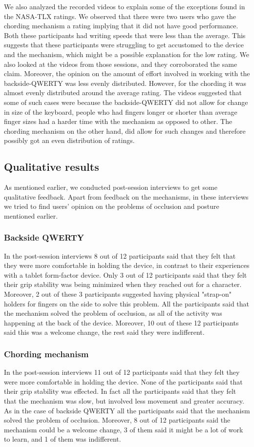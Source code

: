 We also analyzed the recorded videos to explain some of the exceptions found in the NASA-TLX ratings. We observed that there were two users who gave the chording mechanism a rating implying that it did not have good performance. Both these participants had writing speeds that were less than the average. This suggests that these participants were struggling to get accustomed to the device and the mechanism, which might be a possible explanation for the low rating. We also looked at the videos from those sessions, and they corroborated the same claim. Moreover, the opinion on the amount of effort involved in working with the backside-QWERTY was less evenly distributed. However, for the chording it was almost evenly distributed around the average rating. The videos suggested that some of such cases were because the backside-QWERTY did not allow for change in size of the keyboard, people who had fingers longer or shorter than average finger sizes had a harder time with the mechanism as opposed to other. The chording mechanism on the other hand, did allow for such changes and therefore possibly got an even distribution of ratings.

\subsection{Qualitative results}
As mentioned earlier, we conducted post-session interviews to get some qualitative feedback. Apart from feedback on the mechanisms, in these interviews we tried to find users' opinion on the problems of occlusion and posture mentioned earlier.
\subsubsection{Backside QWERTY}
In the post-session interviews 8 out of 12 participants said that they felt that they were more comfortable in holding the device, in contrast to their experiences with a tablet form-factor device.
Only 3 out of 12 participants said that they felt their grip stability was being minimized when they reached out for a character. Moreover, 2 out of these 3 participants suggested having physical "strap-on" holders for fingers on the side to solve this problem. All the participants said that the mechanism solved the problem of occlusion, as all of the activity was happening at the back of the device. Moreover, 10 out of these 12 participants said this was a welcome change, the rest said they were indifferent.
\subsubsection{Chording mechanism}
In the post-session interviews 11 out of 12 participants said that they felt they were more comfortable in holding the device. None of the participants said that their grip stability was effected. In fact all the participants said that they felt that the mechanism was slow, but involved less movement and greater accuracy. As in the case of backside QWERTY all the participants said that the mechanism solved the problem of occlusion. Moreover, 8 out of 12 participants said the mechanism could be a welcome change, 3 of them said it might be a lot of work to learn, and 1 of them was indifferent.

